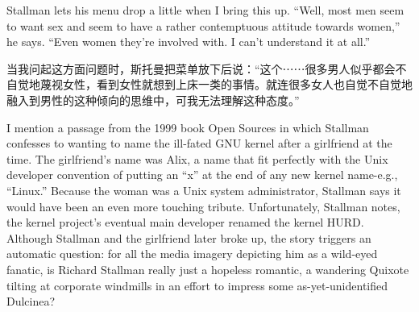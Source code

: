 \ifdefined\eng
Stallman lets his menu drop a little when I bring this up. ``Well, most men seem to want sex and seem to have a rather contemptuous attitude towards women,'' he says. ``Even women they're involved with. I can't understand it at all.''
\fi

\ifdefined\chs
当我问起这方面问题时，斯托曼把菜单放下后说：``这个⋯⋯很多男人似乎都会不自觉地蔑视女性，看到女性就想到上床一类的事情。就连很多女人也自觉不自觉地融入到男性的这种倾向的思维中，可我无法理解这种态度。''
\fi

\ifdefined\eng
\ifdefined\vone
I mention a passage from the 1999 book Open Sources in which Stallman confesses to wanting to name the ill-fated GNU kernel after a girlfriend at the time. The girlfriend's name was Alix, a name that fit perfectly with the Unix developer convention of putting an ``x'' at the end of any new kernel name-e.g., ``Linux.'' Because the woman was a Unix system administrator, Stallman says it would have been an even more touching tribute. Unfortunately, Stallman notes, the kernel project's eventual main developer renamed the kernel HURD. Although Stallman and the girlfriend later broke up, the story triggers an automatic question: for all the media imagery depicting him as a wild-eyed fanatic, is Richard Stallman really just a hopeless romantic, a wandering Quixote tilting at corporate windmills in an effort to impress some as-yet-unidentified Dulcinea?
\fi
\ifdefined\vtwo
